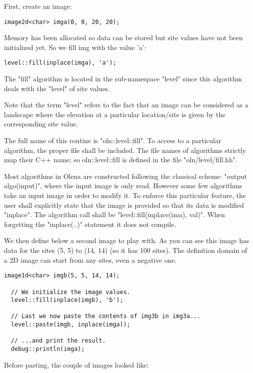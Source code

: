 \documentclass{report}
\begin{document}
First, create an image:
\begin{lstlisting}[frame=single]
  image2d<char> imga(0, 0, 20, 20);
\end{lstlisting}

Memory has been allocated so data can be stored but site values
have not been initialized yet.  So we fill img with the value 'a':
\begin{lstlisting}[frame=single]
  level::fill(inplace(imga), 'a');
\end{lstlisting}

The "fill" algorithm is located in the sub-namespace "level" since this
algorithm deals with the "level" of site values.

Note that the term "level" refers to the fact that an image can be considered as
a landscape where the elevation at a particular location/site is given by
the corresponding site value.

The full name of this routine is "oln::level::fill".  To access to a particular
algorithm, the proper file shall be included. The file names of algorithms
strictly map their C++ name; so oln::level::fill is defined in the file
"oln/level/fill.hh".

Most algorithms in Olena are constructed following the classical scheme: "output
algo(input)", where the input image is only read. However some few algorithms
take an input image in order to modify it.  To enforce this particular feature,
the user shall explicitly state that the image is provided so that its data is
modified "inplace". The algorithm call shall be "level::fill(inplace(ima),
val)". When forgetting the "inplace(..)" statement it does not compile.

We then define below a second image to play with.  As you can see this image has
data for the sites (5, 5) to (14, 14) (so it has 100 sites).  The definition
domain of a 2D image can start from any sites, even a negative one.

\begin{lstlisting}[frame=single]
  image1d<char> imgb(5, 5, 14, 14);

  // We initialize the image values.
  level::fill(inplace(imgb), 'b');

  // Last we now paste the contents of img3b in img3a...
  level::paste(imgb, inplace(imga));

  // ...and print the result.
  debug::println(imga);
\end{lstlisting}

Before pasting, the couple of images looked like:
\end{document}
